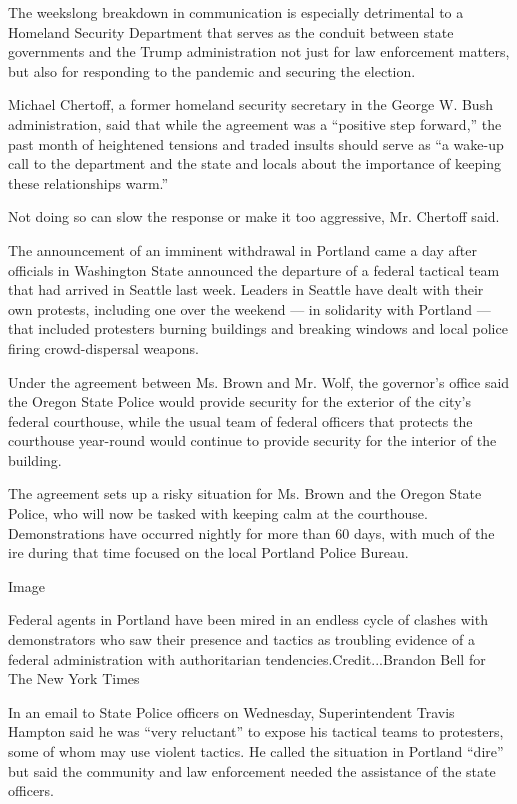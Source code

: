 The weekslong breakdown in communication is especially detrimental to a
Homeland Security Department that serves as the conduit between state
governments and the Trump administration not just for law enforcement
matters, but also for responding to the pandemic and securing the
election.

Michael Chertoff, a former homeland security secretary in the George W.
Bush administration, said that while the agreement was a ``positive step
forward,'' the past month of heightened tensions and traded insults
should serve as ``a wake-up call to the department and the state and
locals about the importance of keeping these relationships warm.''

Not doing so can slow the response or make it too aggressive, Mr.
Chertoff said.

The announcement of an imminent withdrawal in Portland came a day after
officials in Washington State announced the departure of a federal
tactical team that had arrived in Seattle last week. Leaders in Seattle
have dealt with their own protests, including one over the weekend ---
in solidarity with Portland --- that included protesters burning
buildings and breaking windows and local police firing crowd-dispersal
weapons.

Under the agreement between Ms. Brown and Mr. Wolf, the governor's
office said the Oregon State Police would provide security for the
exterior of the city's federal courthouse, while the usual team of
federal officers that protects the courthouse year-round would continue
to provide security for the interior of the building.

The agreement sets up a risky situation for Ms. Brown and the Oregon
State Police, who will now be tasked with keeping calm at the
courthouse. Demonstrations have occurred nightly for more than 60 days,
with much of the ire during that time focused on the local Portland
Police Bureau.

Image

Federal agents in Portland have been mired in an endless cycle of
clashes with demonstrators who saw their presence and tactics as
troubling evidence of a federal administration with authoritarian
tendencies.Credit...Brandon Bell for The New York Times

In an email to State Police officers on Wednesday, Superintendent Travis
Hampton said he was ``very reluctant'' to expose his tactical teams to
protesters, some of whom may use violent tactics. He called the
situation in Portland ``dire'' but said the community and law
enforcement needed the assistance of the state officers.

